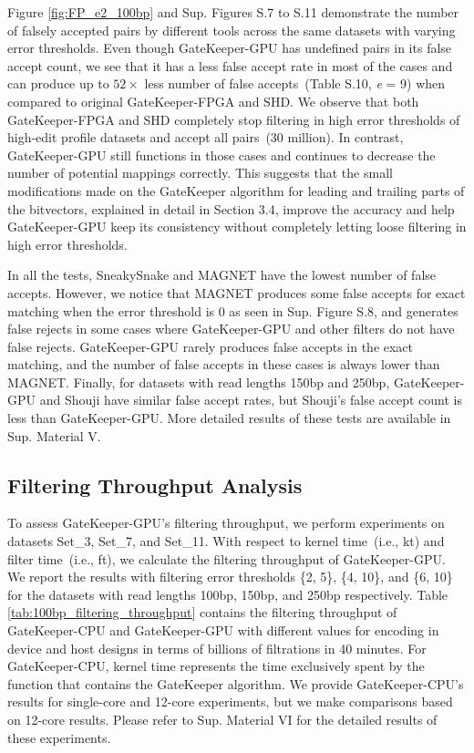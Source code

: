 Figure \ref{fig:FP_e2_100bp} and Sup. Figures S.7 to S.11 demonstrate the number of falsely accepted pairs by different tools across the same datasets with varying error thresholds. Even though GateKeeper-GPU has undefined pairs in its false accept count, we see that it has a less false accept rate in most of the cases and can produce up to $52\times$ less number of false accepts~(Table S.10, \textit{e} = 9) when compared to original GateKeeper-FPGA and SHD. We observe that both GateKeeper-FPGA and SHD completely stop filtering in high error thresholds of high-edit profile datasets and accept all pairs~(30 million). In contrast, GateKeeper-GPU still functions in those cases and continues to decrease the number of potential mappings correctly. This suggests that the small modifications made on the GateKeeper algorithm for leading and trailing parts of the bitvectors, explained in detail in Section 3.4, improve the accuracy and help GateKeeper-GPU keep its consistency without completely letting loose filtering in high error thresholds.

In all the tests, SneakySnake and MAGNET have the lowest number of false accepts. However, we notice that MAGNET produces some false accepts for exact matching when the error threshold is 0 as seen in Sup. Figure S.8, and generates false rejects in some cases where GateKeeper-GPU and other filters do not have false rejects. GateKeeper-GPU rarely produces false accepts in the exact matching, and the number of false accepts in these cases is always lower than MAGNET. Finally, for datasets with read lengths 150bp and 250bp, GateKeeper-GPU and Shouji have similar false accept rates, but Shouji's false accept count is less than GateKeeper-GPU. More detailed results of these tests are available in Sup. Material V.

\subsection{Filtering Throughput Analysis}
To assess GateKeeper-GPU's filtering throughput, we perform experiments on datasets Set\_3, Set\_7, and Set\_11. With respect to kernel time~(i.e., kt) and filter time~(i.e., ft), we calculate the filtering throughput of GateKeeper-GPU. We report the results with filtering error thresholds \{2, 5\}, \{4, 10\}, and  \{6, 10\} for the datasets with read lengths 100bp, 150bp, and 250bp respectively. Table \ref{tab:100bp_filtering_throughput} contains the filtering throughput of GateKeeper-CPU and GateKeeper-GPU with different values for encoding in device and host designs in terms of billions of filtrations in 40 minutes. For GateKeeper-CPU, kernel time represents the time exclusively spent by the function that contains the GateKeeper algorithm. We provide GateKeeper-CPU's results for single-core and 12-core experiments, but we make comparisons based on 12-core results. Please refer to Sup. Material VI for the detailed results of these experiments.


